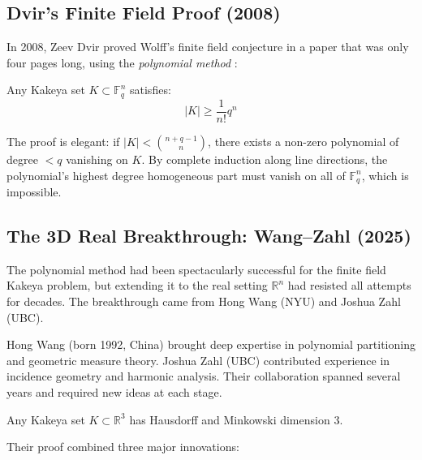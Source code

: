 \subsection{Dvir's Finite Field Proof (2008)}
In 2008, Zeev Dvir proved Wolff's finite field conjecture in a paper that was only four pages long, using the \emph{polynomial method} \cite{dvir2009}:

\begin{theorem}
Any Kakeya set $K \subset \mathbb{F}_q^n$ satisfies:
\begin{equation}
|K| \geq \frac{1}{n!} q^n
\end{equation}
\end{theorem}

The proof is elegant: if $|K| < \binom{n+q-1}{n}$, there exists a non-zero polynomial of degree $<q$ vanishing on $K$. By complete induction along line directions, the polynomial's highest degree homogeneous part must vanish on all of $\mathbb{F}_q^n$, which is impossible.

\subsection{The 3D Real Breakthrough: Wang--Zahl (2025)}

The polynomial method had been spectacularly successful for the finite field Kakeya problem, but extending it to the real setting $\mathbb{R}^n$ had resisted all attempts for decades. The breakthrough came from Hong Wang (NYU) and Joshua Zahl (UBC).

\begin{historicalbox}
Hong Wang (born 1992, China) brought deep expertise in polynomial partitioning and geometric measure theory. Joshua Zahl (UBC) contributed experience in incidence geometry and harmonic analysis. Their collaboration spanned several years and required new ideas at each stage.
\end{historicalbox}

\begin{theorem}
Any Kakeya set $K \subset \mathbb{R}^3$ has Hausdorff and Minkowski dimension $3$.
\end{theorem}

Their proof combined three major innovations:

